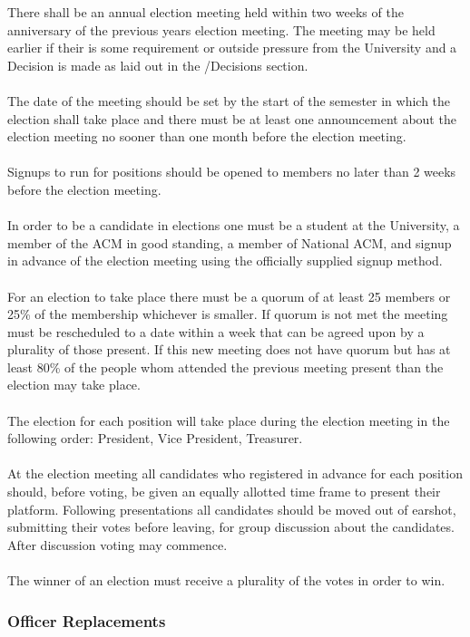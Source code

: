 \documentclass[12pt,titlepage]{article}
\begin{document}
There shall be an annual election meeting held within two weeks of the anniversary of the previous years election meeting. The meeting may be held earlier if their is some requirement or outside pressure from the University and a Decision is made as laid out in the /Decisions section.\\
\\
The date of the meeting should be set by the start of the semester in which the election shall take place and there must be at least one announcement about the election meeting no sooner than one month before the election meeting.\\
\\
Signups to run for positions should be opened to members no later than 2 weeks before the election meeting.\\
\\
In order to be a candidate in elections one must be a student at the University, a member of the ACM in good standing, a member of National ACM, and signup in advance of the election meeting using the officially supplied signup method.\\
\\
For an election to take place there must be a quorum of at least 25 members or 25\% of the membership whichever is smaller. If quorum is not met the meeting must be rescheduled to a date within a week that can be agreed upon by a plurality of those present. If this new meeting does not have quorum but has at least 80\% of the people whom attended the previous meeting present than the election may take place.\\
\\
The election for each position will take place during the election meeting in the following order: President, Vice President, Treasurer.\\
\\
At the election meeting all candidates who registered in advance for each position should, before voting, be given an equally allotted time frame to present their platform. Following presentations all candidates should be moved out of earshot, submitting their votes before leaving, for group discussion about the candidates. After discussion voting may commence.\\
\\
The winner of an election must receive a plurality of the votes in order to win.

\subsubsection{Officer Replacements}
\end{document}
